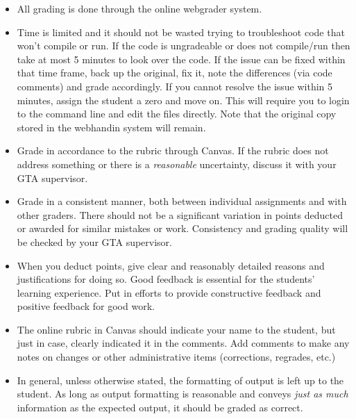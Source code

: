 \documentclass[12pt]{scrartcl}
\begin{document}
\begin{itemize}
  \item All grading is done through the online webgrader system.  
  \item Time is limited and it should not be wasted trying to troubleshoot 
    code that won't compile or run.  If the code is ungradeable or does not
    compile/run then take at most 5 minutes to look over
    the code.  If the issue can be fixed within that time frame, back up the
    original, fix it, note the differences (via code comments) and grade 
    accordingly.  If you cannot resolve the issue within 5 minutes, assign
    the student a zero and move on.  This will require you to login to the
    command line and edit the files directly.  Note that the original copy
    stored in the webhandin system will remain.
  \item Grade in accordance to the rubric through Canvas.  If the rubric 
    does not address something or there is a \emph{reasonable} uncertainty, 
    discuss it with your GTA supervisor.
  \item Grade in a consistent manner, both between individual assignments and
    with other graders.  There should not be a significant variation in
    points deducted or awarded for similar mistakes or work.  Consistency 
    and grading quality will be checked by your GTA supervisor.
  \item When you deduct points, give clear and reasonably detailed reasons
    and justifications for doing so.  Good feedback is essential for the
    students' learning experience.  Put in efforts to provide constructive
    feedback and positive feedback for good work.
  \item The online rubric in Canvas should indicate your name to the student, 
    but just in case, clearly indicated it in the comments.  Add comments to
    make any notes on changes or other administrative items (corrections, 
    regrades, etc.)
  \item In general, unless otherwise stated, the formatting of output is
  left up to the student.  As long as output formatting is reasonable and
  conveys \emph{just as much} information as the expected output, it should
  be graded as correct.
\end{itemize}
\end{document}
